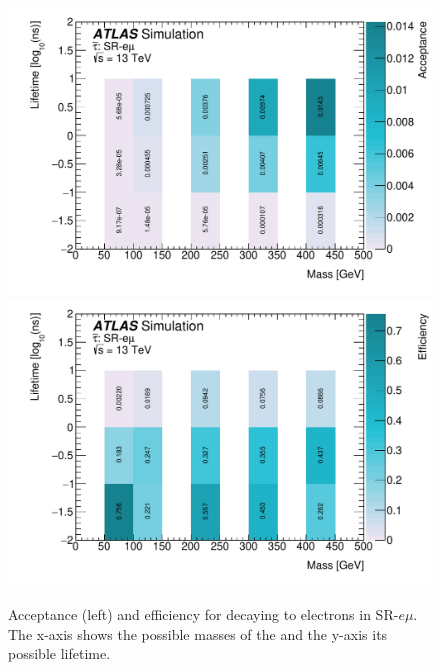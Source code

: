 \begin{figure}[htbp]
\centering
\includegraphics[width=.48\textwidth]{figures/event_selection/stau_acc_em.pdf}
\includegraphics[width=.48\textwidth]{figures/event_selection/stau_eff_em.pdf}
\caption{Acceptance (left) and efficiency for \stau decaying to electrons in SR-$e\mu$. The x-axis shows the possible masses of the \stau and the y-axis its possible lifetime.}
\label{fig:acc-eff-em-stau}
\end{figure}




